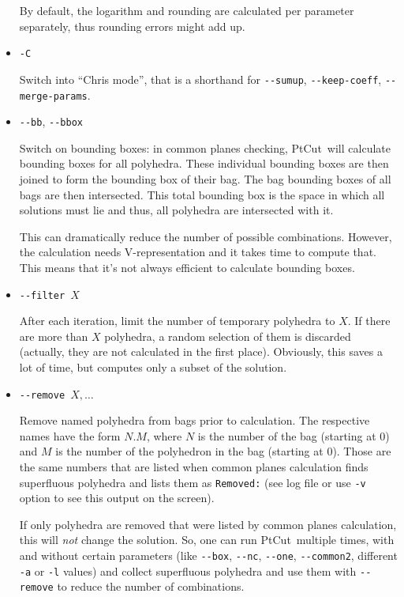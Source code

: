 \documentclass[a4paper,11pt]{article}
\newcommand*\ptcut{\textsf{PtCut}}
\begin{document}
\begin{itemize}
By default, the logarithm and rounding are calculated per parameter separately,
thus rounding errors might add up.

\item \texttt{-C}\par
Switch into ``Chris mode'', that is a shorthand for
\texttt{-{}-sumup}, \texttt{-{}-keep-coeff}, \texttt{-{}-merge-params}.

\item \texttt{-{}-bb}, \texttt{-{}-bbox}\par
Switch on bounding boxes: in common planes checking, \ptcut\ will calculate
bounding boxes for all polyhedra. These individual bounding boxes are then
joined to form the bounding box of their bag. The bag bounding boxes of all bags
are then intersected.  This total bounding box is the space in which all solutions
must lie and thus, all polyhedra are intersected with it.

This can dramatically reduce the number of possible combinations.  However,
the calculation needs V-representation and it takes time to compute that.
This means that it's not always efficient to calculate bounding boxes.

\item \texttt{-{}-filter~$X$}\par
After each iteration, limit the number of temporary polyhedra to $X$.
If there are more than $X$ polyhedra, a random selection of them is discarded
(actually, they are not calculated in the first place).  Obviously, this
saves a lot of time, but computes only a subset of the solution.

\item \texttt{-{}-remove~$X, \ldots$}\par
Remove named polyhedra from bags prior to calculation. The respective names
have the form $N.M$, where $N$ is the number of the bag (starting at $0$)
and $M$ is the number of the polyhedron in the bag (starting at $0$).
Those are the same numbers that are listed when common planes
calculation finds superfluous polyhedra and lists them as \texttt{Removed:}
(see log file or use \texttt{-v} option to see this output on the screen).

If only polyhedra are removed that were listed by common planes calculation,
this will \emph{not} change the solution. So, one can run \ptcut\
multiple times, with and without certain parameters (like \texttt{-{}-box},
\texttt{-{}-nc}, \texttt{-{}-one}, \texttt{-{}-common2}, different \texttt{-a}
or \texttt{-l} values) and collect superfluous polyhedra and use them
with \texttt{-{}-remove} to reduce the number of combinations.


\end{itemize}
\end{document}
